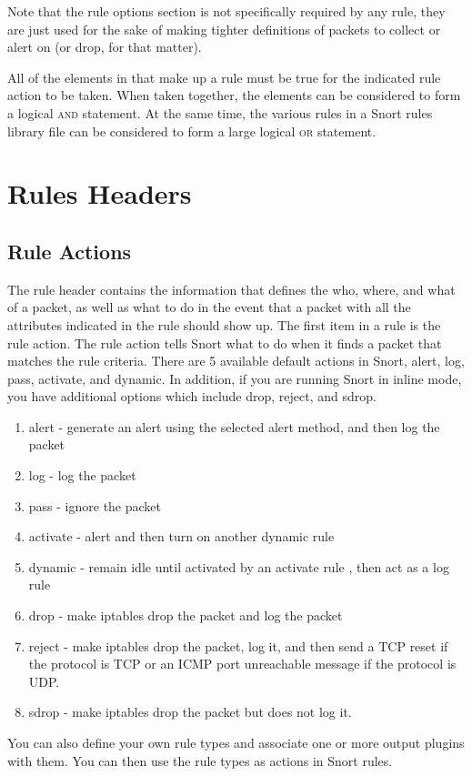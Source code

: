 \documentclass[english]{report}
\newenvironment{note}{
\samepage
    \vspace{10pt}{\textsf{
        {\hspace{7pt}\Huge{$\triangle$\hspace{-12.5pt}{\Large{$^!$}}}}\hspace{5pt}
        {\Large{NOTE}}
    }
    }
   \begin{center}
    \par\vspace{-17pt}

    \begin{lrbox}{\savepar}
    \begin{minipage}[r]{6in}
}
{
    \end{minipage}
    \end{lrbox}
    \fbox{
        \usebox{
            \savepar
	}
    }
    \par\vskip10pt
    \end{center}
}
\begin{document}
\begin{note}
Note that the rule options section is not specifically required by any
rule, they are just used for the sake of making tighter definitions
of packets to collect or alert on (or drop, for that matter). 
\end{note}

All of the elements in that make up a rule must be true for the indicated
rule action to be taken. When taken together, the elements can be
considered to form a logical \textsc{and} statement. At the same time,
the various rules in a Snort rules library file can be considered
to form a large logical \textsc{or} statement. 


\section{Rules Headers}


\subsection{Rule Actions \label{rules action section}}

The rule header contains the information that defines the who,
where, and what of a packet, as well as what to do in the
event that a packet with all the attributes indicated in the rule
should show up. The first item in a rule is the rule action. The rule
action tells Snort what to do when it finds a packet that matches
the rule criteria. There are 5 available default actions in Snort,
alert, log, pass, activate, and dynamic. In addition, if you are running
Snort in inline mode, you have additional options which include drop, reject, and sdrop. 

\begin{enumerate}
\item alert - generate an alert using the selected alert method, and then
log the packet 
\item log - log the packet 
\item pass - ignore the packet 
\item activate - alert and then turn on another dynamic rule  
\item dynamic - remain idle until activated by an activate rule , then act
as a log rule
\item drop - make iptables drop the packet and log the packet
\item reject - make iptables drop the packet, log it, and then send a 
TCP reset if the protocol is TCP or an ICMP port unreachable message if the 
protocol is UDP.
\item sdrop - make iptables drop the packet but does not log it.
\end{enumerate}
You can also define your own rule types and associate one or more
output plugins with them. You can then use the rule types as actions
in Snort rules.
\end{document}
